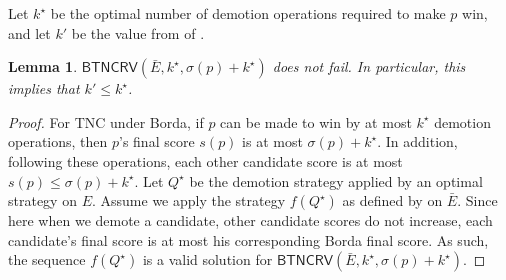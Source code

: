 \documentclass[letterpaper]{article} %
\newtheorem{lemma}{Lemma}
\newcommand{\CUBNBwTA}{Unlimited Borda \SB}
\newcommand{\SB}{\textsc{TNC}}
\newcommand{\CF}{\mathsf{BTNCRV}}
\begin{document}
Let $k^{\star}$  be the optimal number of demotion operations required to make $p$ win, and let $k'$ be the value from  of .
\begin{lemma} \label{k-star-consequenceFreeLemma}
$\CF(\bar{E},k^{\star},\sigma(p)+k^{\star})$ does not fail. In particular, this implies that $k' \leq k^{\star}$.
\end{lemma}
\begin{proof}
For \SB{} under Borda, if $p$ can be made to win by at most $k^\star$ demotion operations, then $p$'s final score $s(p)$ is at most $\sigma(p)+k^\star$. In addition, following these operations, each other candidate score is at most $s(p) \leq \sigma(p)+k^\star$. Let $Q^\star$ be the demotion strategy applied by an optimal strategy on $E$. Assume we apply the strategy $f(Q^\star)$ as defined by  on $\bar{E}$. Since here when we demote a candidate, other candidate scores do not increase, each candidate's final score is at most his corresponding Borda final score. As such, the sequence $f(Q^\star)$ is a valid solution for $\CF(\bar{E},k^{\star},\sigma(p)+k^{\star})$.
\end{proof}

\end{document}
